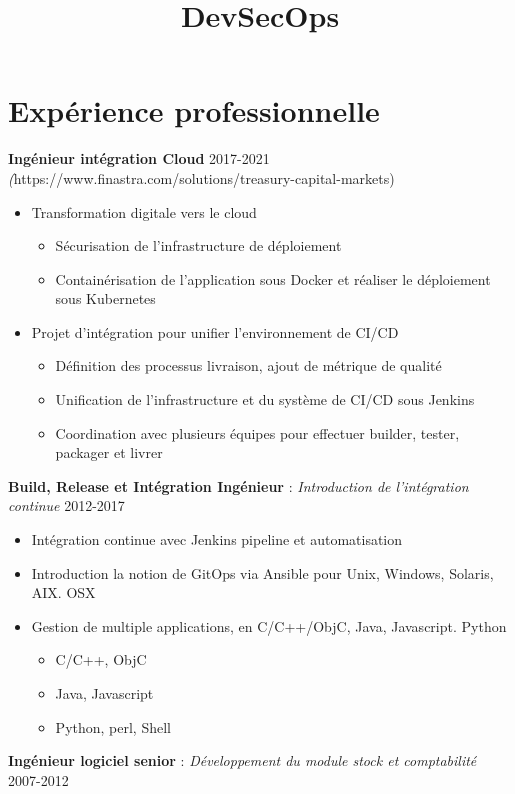 \documentclass[11pt,a4paper]{moderncv}
\title{DevSecOps}
\begin{document}
	
\makecvtitle

\section{Expérience professionnelle}


{
\bigskip
\textbf{Ingénieur intégration Cloud} \hfill 2017-2021
\textit(https://www.finastra.com/solutions/treasury-capital-markets)
\bigskip
	\begin{itemize}%
		\item Transformation digitale vers le cloud  
			\begin{itemize}%
				\item Sécurisation de l'infrastructure de déploiement
				\item Containérisation de l'application sous Docker et réaliser le déploiement sous Kubernetes
			\end{itemize}
	\end{itemize}
\bigskip
	\begin{itemize}%
	\item	Projet d’intégration pour unifier l'environnement de CI/CD
		\begin{itemize}%
				\item Définition des processus livraison, ajout de métrique de qualité
				\item Unification de l'infrastructure et du système de CI/CD sous Jenkins
				\item Coordination avec plusieurs équipes pour effectuer builder, tester, packager  et livrer
		\end{itemize}
	\end{itemize}
\bigskip
 \textbf{Build, Release et Intégration Ingénieur} : \textit{Introduction de l'intégration continue} \hfill 2012-2017
\bigskip
			\begin{itemize}%
				\item Intégration continue avec Jenkins pipeline et automatisation
                \item Introduction la notion de GitOps via Ansible pour Unix, Windows, Solaris, AIX. OSX
				\item Gestion de multiple applications, en C/C++/ObjC, Java, Javascript. Python
					\begin{itemize}	
						\item C/C++, ObjC
						\item Java, Javascript
						\item Python, perl, Shell
					\end{itemize}				
				\end{itemize}
\bigskip
\textbf{Ingénieur logiciel senior} : \textit{Développement du module stock et comptabilité} \hfill 2007-2012

}
\end{document}
